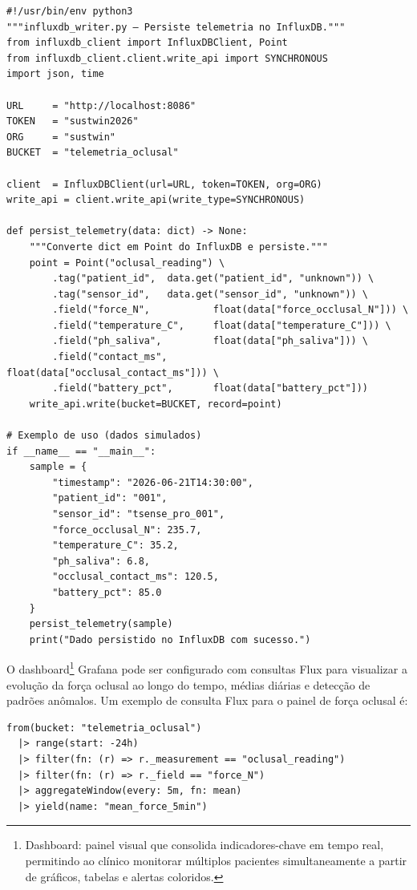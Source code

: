 \begin{lstlisting}[style=pythonstyle, caption=Escrita de dados processados no InfluxDB, label=cod:influx]
#!/usr/bin/env python3
"""influxdb_writer.py — Persiste telemetria no InfluxDB."""
from influxdb_client import InfluxDBClient, Point
from influxdb_client.client.write_api import SYNCHRONOUS
import json, time

URL     = "http://localhost:8086"
TOKEN   = "sustwin2026"
ORG     = "sustwin"
BUCKET  = "telemetria_oclusal"

client  = InfluxDBClient(url=URL, token=TOKEN, org=ORG)
write_api = client.write_api(write_type=SYNCHRONOUS)

def persist_telemetry(data: dict) -> None:
    """Converte dict em Point do InfluxDB e persiste."""
    point = Point("oclusal_reading") \
        .tag("patient_id",  data.get("patient_id", "unknown")) \
        .tag("sensor_id",   data.get("sensor_id", "unknown")) \
        .field("force_N",           float(data["force_occlusal_N"])) \
        .field("temperature_C",     float(data["temperature_C"])) \
        .field("ph_saliva",         float(data["ph_saliva"])) \
        .field("contact_ms",        float(data["occlusal_contact_ms"])) \
        .field("battery_pct",       float(data["battery_pct"]))
    write_api.write(bucket=BUCKET, record=point)

# Exemplo de uso (dados simulados)
if __name__ == "__main__":
    sample = {
        "timestamp": "2026-06-21T14:30:00",
        "patient_id": "001",
        "sensor_id": "tsense_pro_001",
        "force_occlusal_N": 235.7,
        "temperature_C": 35.2,
        "ph_saliva": 6.8,
        "occlusal_contact_ms": 120.5,
        "battery_pct": 85.0
    }
    persist_telemetry(sample)
    print("Dado persistido no InfluxDB com sucesso.")
\end{lstlisting}

O dashboard\footnote{Dashboard: painel visual que consolida indicadores-chave em tempo real, permitindo ao clínico monitorar múltiplos pacientes simultaneamente a partir de gráficos, tabelas e alertas coloridos.} Grafana pode ser configurado com consultas Flux para visualizar a evolução da força oclusal ao longo do tempo, médias diárias e detecção de padrões anômalos. Um exemplo de consulta Flux para o painel de força oclusal é:

\begin{lstlisting}[style=pythonstyle, caption=Consulta Flux para dashboard Grafana, label=cod:flux]
from(bucket: "telemetria_oclusal")
  |> range(start: -24h)
  |> filter(fn: (r) => r._measurement == "oclusal_reading")
  |> filter(fn: (r) => r._field == "force_N")
  |> aggregateWindow(every: 5m, fn: mean)
  |> yield(name: "mean_force_5min")
\end{lstlisting}


